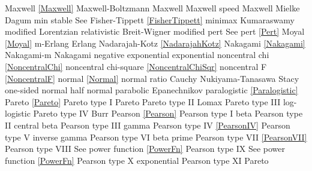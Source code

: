 Maxwell 						\dotfill	\eqref{Maxwell} 					\ncite	%
Maxwell-Boltzmann 				\dotfill	Maxwell 							\ncite 	%
Maxwell speed					\dotfill	Maxwell 							\ncite	%
Mielke							\dotfill	Dagum								\ncite	%
min stable						\dotfill	See Fisher-Tippett \eqref{FisherTippett}	\ncite
minimax 						\dotfill	Kumaraswamy 						 	%
modified Lorentzian				\dotfill	relativistic Breit-Wigner				%
modified pert					\dotfill	See pert \eqref{Pert}				\ncite	%
Moyal							\dotfill	\eqref{Moyal}						\ncite	
m-Erlang						\dotfill	Erlang 								\ncite	%
%
Nadarajah-Kotz					\dotfill	\eqref{NadarajahKotz}				\mcite{\self}	%
Nakagami 						\dotfill	\eqref{Nakagami} 					\ncite	%
Nakagami-m 						\dotfill	Nakagami 							\ncite   	%
negative exponential			\dotfill	exponential 						\ncite	%
noncentral chi					\dotfill	\eqref{NoncentralChi}				\ncite
noncentral chi-square			\dotfill	\eqref{NoncentralChiSqr}			\ncite
noncentral F					\dotfill	\eqref{NoncentralF}					\ncite	%
normal 							\dotfill	\eqref{Normal}						\ncite	%
normal ratio  					\dotfill	Cauchy 								\ncite	%
Nukiyama-Tanasawa 				\dotfill	Stacy 								   	%
%
one-sided normal  				\dotfill	half normal							\ncite	%
parabolic						\dotfill	Epanechnikov						\ncite
paralogistic					\dotfill	\eqref{Paralogistic} 				\ncite	%
Pareto							\dotfill	\eqref{Pareto}						\ncite	%
Pareto type I					\dotfill	Pareto								\ncite	%
Pareto type II					\dotfill	Lomax 								\ncite	%
Pareto type III					\dotfill	log-logistic						\ncite	%
Pareto type IV					\dotfill	Burr								\ncite	%
Pearson			 				\dotfill	\eqref{Pearson}						\ncite	%
Pearson type I					\dotfill	beta 								\ncite	%
Pearson type II					\dotfill	central beta						\ncite	%
Pearson type III   				\dotfill	gamma 								\ncite	%
Pearson type IV   				\dotfill	\eqref{PearsonIV} 					\ncite	%
Pearson type V    				\dotfill	inverse gamma						\ncite	%
Pearson type VI					\dotfill	beta prime 							\ncite	%
Pearson type VII				\dotfill	\eqref{PearsonVII} 					\ncite	%
Pearson type VIII				\dotfill	See power function \eqref{PowerFn}	\ncite	%
Pearson type IX					\dotfill	See power function \eqref{PowerFn}	\ncite	%
Pearson type X    				\dotfill	exponential							\ncite	%
Pearson type XI    				\dotfill	Pareto								
